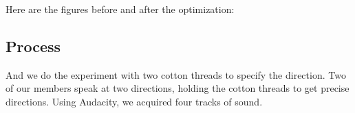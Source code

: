 \documentclass[UTF8]{article}
\begin{document}
Here are the figures before and after the optimization:
\begin{figure}[H]
    \centering
    \hspace{0.4in}
\end{figure}

\subsection{Process}
\hspace{0.5em} And we do the experiment with two cotton threads to specify the direction. Two of our members speak at two directions, holding the cotton threads to get precise directions. Using Audacity, we acquired four tracks of sound.
\end{document}
